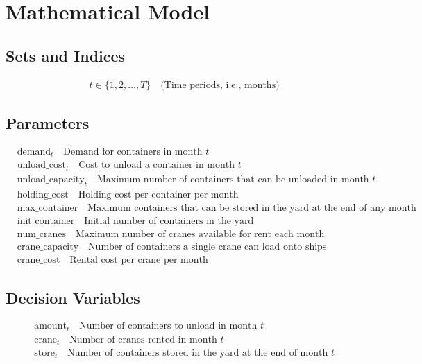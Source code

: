 \documentclass{article}
\begin{document}
\section*{Mathematical Model}

\subsection*{Sets and Indices}
\begin{align*}
    & t \in \{1, 2, \ldots, T\} \quad \text{(Time periods, i.e., months)}
\end{align*}

\subsection*{Parameters}
\begin{align*}
    & \text{demand}_{t} \quad \text{Demand for containers in month } t \\
    & \text{unload\_cost}_{t} \quad \text{Cost to unload a container in month } t \\
    & \text{unload\_capacity}_{t} \quad \text{Maximum number of containers that can be unloaded in month } t \\
    & \text{holding\_cost} \quad \text{Holding cost per container per month} \\
    & \text{max\_container} \quad \text{Maximum containers that can be stored in the yard at the end of any month} \\
    & \text{init\_container} \quad \text{Initial number of containers in the yard} \\
    & \text{num\_cranes} \quad \text{Maximum number of cranes available for rent each month} \\
    & \text{crane\_capacity} \quad \text{Number of containers a single crane can load onto ships} \\
    & \text{crane\_cost} \quad \text{Rental cost per crane per month}
\end{align*}

\subsection*{Decision Variables}
\begin{align*}
    & \text{amount}_{t} \quad \text{Number of containers to unload in month } t \\
    & \text{crane}_{t} \quad \text{Number of cranes rented in month } t \\
    & \text{store}_{t} \quad \text{Number of containers stored in the yard at the end of month } t
\end{align*}
\end{document}
